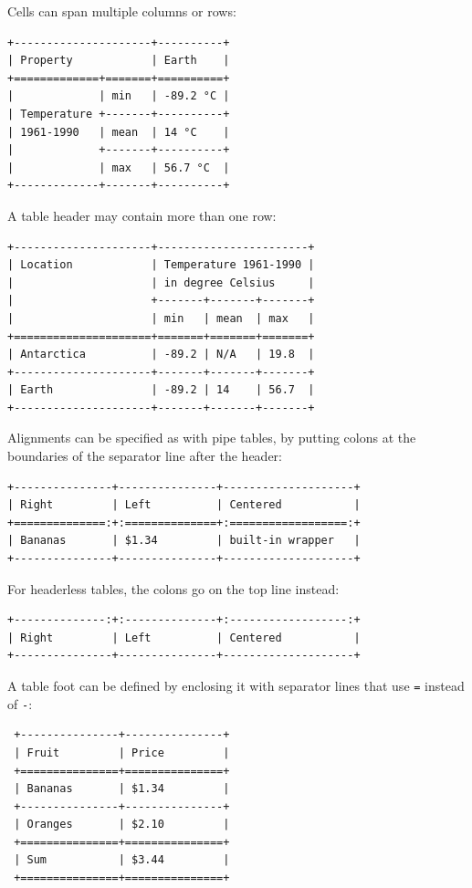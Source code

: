 \documentclass[
  b5paper
]{book}
\begin{document}
Cells can span multiple columns or rows:

\begin{verbatim}
+---------------------+----------+
| Property            | Earth    |
+=============+=======+==========+
|             | min   | -89.2 °C |
| Temperature +-------+----------+
| 1961-1990   | mean  | 14 °C    |
|             +-------+----------+
|             | max   | 56.7 °C  |
+-------------+-------+----------+
\end{verbatim}

A table header may contain more than one row:

\begin{verbatim}
+---------------------+-----------------------+
| Location            | Temperature 1961-1990 |
|                     | in degree Celsius     |
|                     +-------+-------+-------+
|                     | min   | mean  | max   |
+=====================+=======+=======+=======+
| Antarctica          | -89.2 | N/A   | 19.8  |
+---------------------+-------+-------+-------+
| Earth               | -89.2 | 14    | 56.7  |
+---------------------+-------+-------+-------+
\end{verbatim}

Alignments can be specified as with pipe tables, by putting colons at
the boundaries of the separator line after the header:

\begin{verbatim}
+---------------+---------------+--------------------+
| Right         | Left          | Centered           |
+==============:+:==============+:==================:+
| Bananas       | $1.34         | built-in wrapper   |
+---------------+---------------+--------------------+
\end{verbatim}

For headerless tables, the colons go on the top line instead:

\begin{verbatim}
+--------------:+:--------------+:------------------:+
| Right         | Left          | Centered           |
+---------------+---------------+--------------------+
\end{verbatim}

A table foot can be defined by enclosing it with separator lines that
use \texttt{=} instead of \texttt{-}:

\begin{verbatim}
 +---------------+---------------+
 | Fruit         | Price         |
 +===============+===============+
 | Bananas       | $1.34         |
 +---------------+---------------+
 | Oranges       | $2.10         |
 +===============+===============+
 | Sum           | $3.44         |
 +===============+===============+
\end{verbatim}
\end{document}
